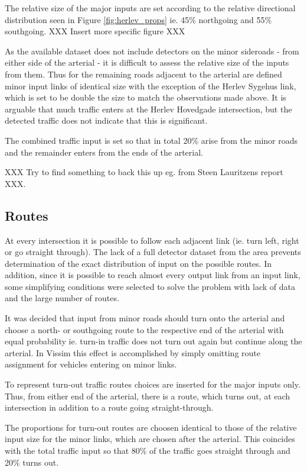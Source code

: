 The relative size of the major inputs are set according to the relative directional distribution seen in Figure \ref{fig:herlev_props} ie. 45\% northgoing and 55\% southgoing. XXX Insert more specific figure XXX

As the available dataset does not include detectors on the minor sideroads - from either side of the arterial - it is difficult to assess the relative size of the inputs from them. Thus for the remaining roads adjacent to the arterial are defined minor input links of identical size with the exception of the Herlev Sygehus link, which is set to be double the size to match the observations made above.
It is arguable that much traffic enters at the Herlev Hovedgade intersection, but the detected traffic does not indicate that this is significant.

The combined traffic input is set so that in total 20\% arise from the minor roads and the remainder enters from the ends of the arterial. 

XXX Try to find something to back this up eg. from Steen Lauritzens report XXX.

\subsection{Routes}
At every intersection it is possible to follow each adjacent link (ie. turn left, right or go straight through). The lack of a full detector dataset from the area prevents determination of the exact distribution of input on the possible routes. In addition, since it is possible to reach almost every output link from an input link, some simplifying conditions were selected to solve the problem with lack of data and the large number of routes.

It was decided that input from minor roads should turn onto the arterial and choose a north- or southgoing route to the respective end of the arterial with equal probability ie. turn-in traffic does not turn out again but continue along the arterial. In Vissim this effect is accomplished by simply omitting route assignment for vehicles entering on minor links.

To represent turn-out traffic routes choices are inserted for the major inputs only. Thus, from either end of the arterial, there is a route, which turns out, at each intersection in addition to a route going straight-through. 

The proportions for turn-out routes are choosen identical to those of the relative input size for the minor links, which are chosen after the arterial. This coincides with the total traffic input so that 80\% of the traffic goes straight through and 20\% turns out.